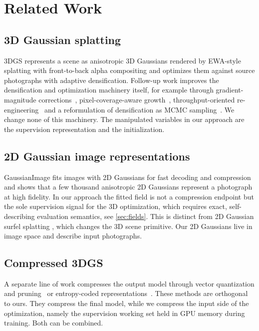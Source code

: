 \section{Related Work}
\label{sec:related}

\subsection{3D Gaussian splatting}
3DGS \citep{kerbl2023_3dgs} represents a scene as anisotropic 3D Gaussians rendered by
EWA-style splatting \citep{zwicker2001_ewa} with front-to-back alpha compositing and
optimizes them against source photographs with adaptive densification.  Follow-up work
improves the densification and optimization machinery itself, for example through
gradient-magnitude corrections~\citep{ye2024_absgs}, pixel-coverage-aware
growth~\citep{zhang2024_pixelgs}, throughput-oriented
re-engineering~\citep{mallick2024_taming} and a reformulation of densification as MCMC
sampling~\citep{kheradmand2024_mcmc}.  We change none of this machinery.  The manipulated
variables in our approach are the supervision representation and the initialization.

\subsection{2D Gaussian image representations}
GaussianImage \citep{zhang2024_gaussianimage} fits images with 2D Gaussians for fast
decoding and compression and shows that a few thousand anisotropic 2D Gaussians represent
a photograph at high fidelity.  In our approach the fitted field is not a compression
endpoint but the sole supervision signal for the 3D optimization, which requires exact,
self-describing evaluation semantics, see \cref{sec:fields}.  This is distinct from 2D
Gaussian surfel splatting \citep{huang2024_2dgs}, which changes the 3D scene primitive.
Our 2D Gaussians live in image space and describe input photographs.

\subsection{Compressed 3DGS}
A separate line of work compresses the output model through vector quantization and
pruning~\citep{lee2024_compact3dgs,fan2024_lightgaussian} or entropy-coded
representations~\citep{niedermayr2024_compressed}.  These methods are orthogonal to ours.
They compress the final model, while we compress the input side of the optimization,
namely the supervision working set held in GPU memory during training.  Both can be
combined.

